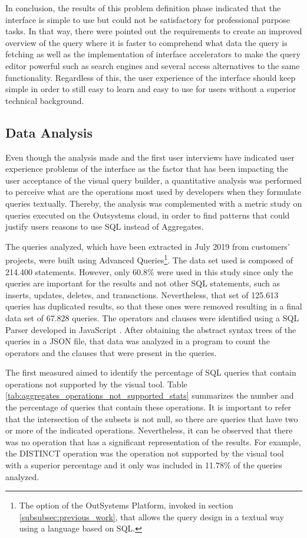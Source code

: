 In conclusion, the results of this problem definition phase indicated that the interface is simple to use but could not be satisfactory for professional purpose tasks. In that way, there were pointed out the requirements to create an improved overview of the query where it is faster to comprehend what data the query is fetching as well as the implementation of interface accelerators to make the query editor powerful such as search engines and several access alternatives to the same functionality. Regardless of this, the user experience of the interface should keep simple in order to still easy to learn and easy to use for users without a superior technical background.

\subsection{Data Analysis}
\label{subsec:data_analysis}

Even though the analysis made and the first user interviews have indicated user experience problems of the interface as the factor that has been impacting the user acceptance of the visual query builder, a quantitative analysis was performed to perceive what are the operations most used by developers when they formulate queries textually. Thereby, the analysis was complemented with a metric study on queries executed on the Outsystems cloud, in order to find patterns that could justify users reasons to use \gls{SQL} instead of Aggregates. 

The queries analyzed, which have been extracted in July 2019 from customers’ projects, were built using Advanced Queries\footnote{The option of the OutSystems Platform, invoked in section \ref{subsubsec:previous_work}, that allows the query design in a textual way using a language based on \gls{SQL}.}. The data set used is composed of 214.400 statements. However, only 60.8\% were used in this study since only the queries are important for the results and not other SQL statements, such as inserts, updates, deletes, and transactions. Nevertheless, that set of 125.613 queries has duplicated results, so that these ones were removed resulting in a final data set of 67.828 queries. The operators and clauses were identified using a \gls{SQL} Parser developed in JavaScript \cite{jsSqlParser}. After obtaining the abstract syntax trees of the queries in a JSON file, that data was analyzed in a program to count the operators and the clauses that were present in the queries. 

The first measured aimed to identify the percentage of \gls{SQL} queries that contain operations not supported by the visual tool. Table \ref{tab:aggregates_operations_not_supported_stats} summarizes the number and the percentage of queries that contain these operations. It is important to refer that the intersection of the subsets is not null, so there are queries that have two or more of the indicated operations. Nevertheless, it can be observed that there was no operation that has a significant representation of the results. For example, the DISTINCT operation was the operation not supported by the visual tool with a superior percentage and it only was included in 11.78\% of the queries analyzed.

